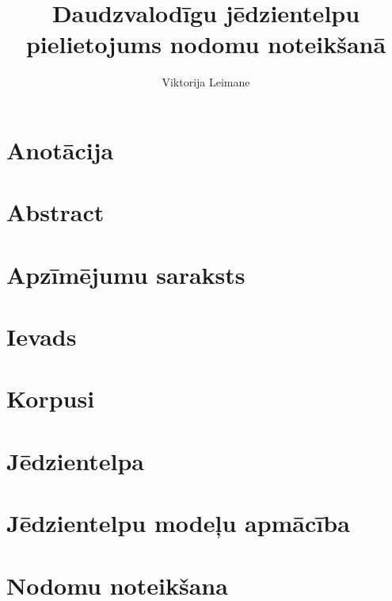 \documentclass[12pt,oneside]{LuThesis}
\title{Daudzvalodīgu jēdzientelpu pielietojums nodomu noteikšanā}
\author{Viktorija Leimane}
\begin{document}
\maketitle

\chapter*{Anotācija}
\setcounter{page}{1}
\begin{abstract}

\end{abstract}

\chapter*{Abstract}
\begin{english}
\begin{abstract}

\end{abstract}
\end{english}

\tableofcontents


\chapter*{Apzīmējumu saraksts}



\chapter*{Ievads}



\chapter{Korpusi}


\chapter{Jēdzientelpa}


\chapter{Jēdzientelpu modeļu apmācība}


\chapter{Nodomu noteikšana}

\end{document}
